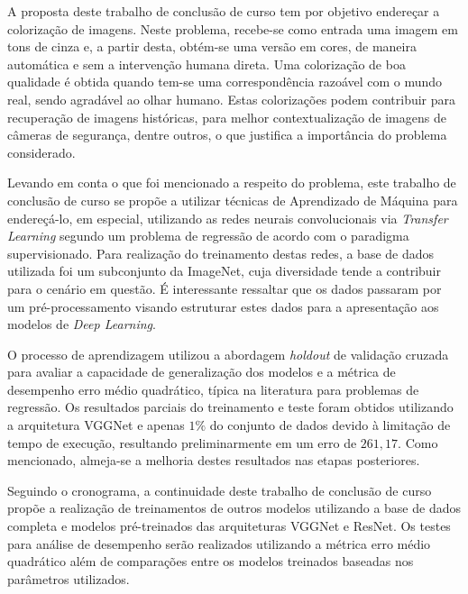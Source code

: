 \begin{comment}
A proposta deste trabalho de conclusão de curso apresenta os procedimentos necessários para endereçar o problema de colorização de imagens utilizando as técnicas de \emph{Deep Learning}. Este problema consiste em obter a coloração de imagens em tons de cinza por meio de transferência de conhecimento utilizando redes neurais convolucionais pré-treinadas e adaptadas a este cenário.
	content...
\end{comment}

A proposta deste trabalho de conclusão de curso tem por objetivo endereçar a colorização de imagens. Neste problema, recebe-se como entrada uma imagem em tons de cinza e, a partir desta, obtém-se uma versão em cores, de maneira automática e sem a intervenção humana direta. Uma colorização de boa qualidade é obtida quando tem-se uma correspondência razoável com o mundo real, sendo agradável ao olhar humano. Estas colorizações podem contribuir para recuperação de  imagens históricas, para melhor contextualização de imagens de câmeras de segurança, dentre outros, o que justifica  a importância  do problema considerado.

Levando em conta o que foi mencionado a respeito do problema, este trabalho de conclusão de curso se propõe a utilizar técnicas de Aprendizado de Máquina para endereçá-lo, em especial, utilizando as redes neurais convolucionais via \emph{Transfer Learning} segundo um problema de regressão de acordo com o paradigma supervisionado. Para realização do treinamento destas redes, a base de dados utilizada foi um subconjunto da ImageNet, cuja diversidade tende a contribuir para o cenário em questão. É interessante ressaltar que os dados passaram por um pré-processamento visando estruturar estes dados para a apresentação aos modelos de \emph{Deep Learning}.

O processo de aprendizagem utilizou a abordagem \emph{holdout} de validação cruzada para avaliar a capacidade de generalização dos modelos e a métrica de desempenho erro médio quadrático, típica na literatura para problemas de regressão. Os resultados parciais do treinamento e teste foram obtidos utilizando a arquitetura VGGNet e apenas $1\%$ do conjunto de dados devido à limitação de tempo de execução, resultando preliminarmente em um erro de $261,17$. Como mencionado, almeja-se a melhoria destes resultados nas etapas posteriores.

Seguindo o cronograma, a continuidade deste trabalho de conclusão de curso propõe a realização de treinamentos de outros modelos utilizando a base de dados completa e modelos pré-treinados das arquiteturas VGGNet e ResNet. Os testes para análise de desempenho serão realizados utilizando a métrica erro médio quadrático além de comparações entre os modelos treinados baseadas nos parâmetros utilizados.

